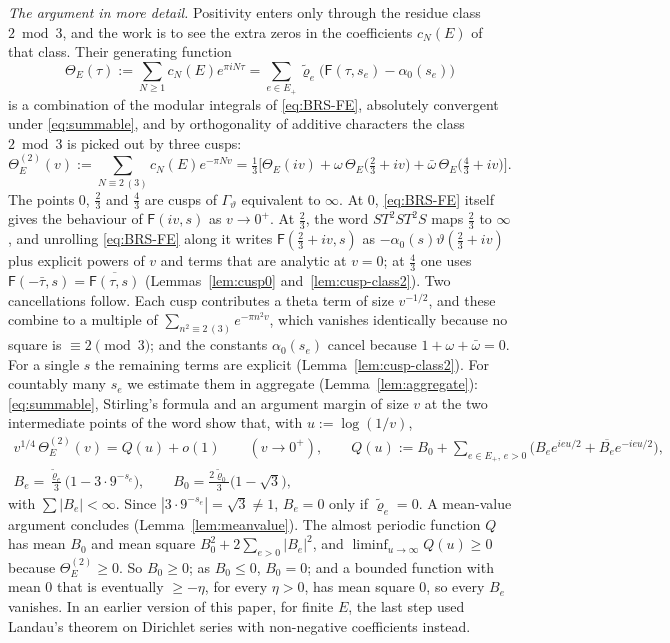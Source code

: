 \emph{The argument in more detail.} Positivity enters only through the residue class $2\bmod3$, and the work is to see the extra
zeros in the coefficients $c_N(E)$ of that class. Their generating function
\[
\Theta_E(\tau):=\sum_{N\ge1}c_N(E)e^{\pi iN\tau}=\sum_{e\in E_+}\tilde\varrho_e\big(\mathsf F(\tau,s_e)-\alpha_0(s_e)\big)
\]
is a combination of the modular integrals of \eqref{eq:BRS-FE}, absolutely convergent under \eqref{eq:summable}, and by orthogonality of
additive characters the class $2\bmod3$ is picked out by three cusps:
\[
\Theta_E^{(2)}(v):=\sum_{N\equiv2\,(3)}c_N(E)e^{-\pi Nv}=\tfrac13\Big[\Theta_E(iv)+\omega\,\Theta_E\big(\tfrac23+iv\big)+\bar\omega\,\Theta_E\big(\tfrac43+iv\big)\Big].
\]
The points $0$, $\frac23$ and $\frac43$ are cusps of $\Gamma_\vartheta$ equivalent to $\infty$. At $0$, \eqref{eq:BRS-FE} itself gives the
behaviour of $\mathsf F(iv,s)$ as $v\to0^+$. At $\frac23$, the word $ST^2ST^2S$ maps $\frac23$ to $\infty$, and unrolling \eqref{eq:BRS-FE}
along it writes $\mathsf F(\frac23+iv,s)$ as $-\alpha_0(s)\vartheta(\frac23+iv)$ plus explicit powers of $v$ and terms that are analytic at
$v=0$; at $\frac43$ one uses $\mathsf F(-\bar\tau,s)=\overline{\mathsf F(\tau,s)}$ (Lemmas~\ref{lem:cusp0} and~\ref{lem:cusp-class2}). Two
cancellations follow. Each cusp contributes a theta term of size $v^{-1/2}$, and these combine to a multiple of
$\sum_{n^2\equiv2\,(3)}e^{-\pi n^2v}$, which vanishes identically because no square is $\equiv2\pmod3$; and the constants
$\alpha_0(s_e)$ cancel because $1+\omega+\bar\omega=0$. For a single $s$ the remaining terms are explicit (Lemma~\ref{lem:cusp-class2}).
For countably many $s_e$ we estimate them in aggregate (Lemma~\ref{lem:aggregate}): \eqref{eq:summable}, Stirling's formula and an
argument margin of size $v$ at the two intermediate points of the word show that, with $u:=\log(1/v)$,
\begin{gather*}
v^{1/4}\,\Theta_E^{(2)}(v)=Q(u)+o(1)\qquad(v\to0^+),\qquad Q(u):=B_0+\sum_{e\in E_+,\,e>0}\big(B_ee^{ieu/2}+\overline{B_e}e^{-ieu/2}\big),\\
B_e=\frac{\tilde\varrho_e}3\big(1-3\cdot9^{-s_e}\big),\qquad B_0=\frac{2\tilde\varrho_0}3\big(1-\sqrt3\big),
\end{gather*}
with $\sum|B_e|<\infty$. Since $|3\cdot9^{-s_e}|=\sqrt3\ne1$, $B_e=0$ only if $\tilde\varrho_e=0$. A mean-value argument concludes
(Lemma~\ref{lem:meanvalue}). The almost periodic function $Q$ has mean $B_0$ and mean square $B_0^2+2\sum_{e>0}|B_e|^2$, and
$\liminf_{u\to\infty}Q(u)\ge0$ because $\Theta_E^{(2)}\ge0$. So $B_0\ge0$; as $B_0\le0$, $B_0=0$; and a bounded function with mean $0$ that is
eventually $\ge-\eta$, for every $\eta>0$, has mean square $0$, so every $B_e$ vanishes. In an earlier version of this paper, for finite
$E$, the last step used Landau's theorem on Dirichlet series with non-negative coefficients \cite[Theorem~1.7]{MV07} instead.

